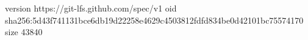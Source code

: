 version https://git-lfs.github.com/spec/v1
oid sha256:5d43f741131bce6db19d22258e4629c4503812fdfd834be0d42101bc75574170
size 43840
